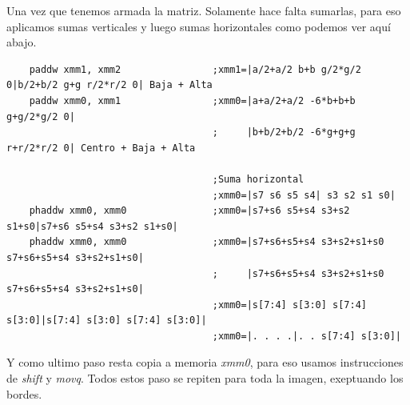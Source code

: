 Una vez que tenemos armada la matriz. Solamente hace falta sumarlas, para eso aplicamos sumas verticales y luego sumas horizontales
como podemos ver aquí abajo.

\begin{codesnippet}
\begin{verbatim}    
    paddw xmm1, xmm2                ;xmm1=|a/2+a/2 b+b g/2*g/2 0|b/2+b/2 g+g r/2*r/2 0| Baja + Alta
    paddw xmm0, xmm1                ;xmm0=|a+a/2+a/2 -6*b+b+b g+g/2*g/2 0| 
                                    ;     |b+b/2+b/2 -6*g+g+g r+r/2*r/2 0| Centro + Baja + Alta	

                                    ;Suma horizontal
                                    ;xmm0=|s7 s6 s5 s4| s3 s2 s1 s0|
    phaddw xmm0, xmm0               ;xmm0=|s7+s6 s5+s4 s3+s2 s1+s0|s7+s6 s5+s4 s3+s2 s1+s0|
    phaddw xmm0, xmm0               ;xmm0=|s7+s6+s5+s4 s3+s2+s1+s0 s7+s6+s5+s4 s3+s2+s1+s0|
                                    ;     |s7+s6+s5+s4 s3+s2+s1+s0 s7+s6+s5+s4 s3+s2+s1+s0|  
                                    ;xmm0=|s[7:4] s[3:0] s[7:4] s[3:0]|s[7:4] s[3:0] s[7:4] s[3:0]|
                                    ;xmm0=|. . . .|. . s[7:4] s[3:0]|
\end{verbatim}
\end{codesnippet}

Y como ultimo paso resta copia a memoria \emph{xmm0}, para eso usamos instrucciones de \emph{shift} y \emph{movq}.
Todos estos paso se repiten para toda la imagen, exeptuando los bordes.
